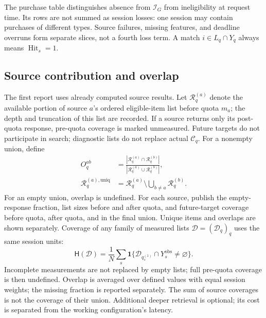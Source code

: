 \documentclass[12pt,a4paper]{article}
\newcommand{\ind}{\mathbf 1}
\theoremstyle{plainru}
\begin{document}
The purchase table distinguishes absence from $\mathcal I_G$
from ineligibility at request time. Its rows are not summed as session
losses: one session may contain purchases of different types.
Source failures, missing features, and deadline overruns
form separate slices, not a fourth loss term.
A match $i\in L_q\cap Y_q$ always means $\operatorname{Hit}_s=1$.

\subsection{Source contribution and overlap}
\label{sec:eval-source-contribution}

The first report uses already computed source results.
Let $\mathcal R_q^{(a)}$ denote the available portion of source $a$'s ordered
eligible-item list before quota $m_a$;
the depth and truncation of this list are recorded. If a source returns
only its post-quota response, pre-quota coverage is marked unmeasured.
Future targets do not participate in search; diagnostic lists
do not replace actual $\mathcal C_q$.
For a nonempty union, define
\begin{align}\label{eq:eval-source-overlap}
O_q^{ab}&=\frac{|\mathcal R_q^{(a)}\cap\mathcal R_q^{(b)}|}
 {|\mathcal R_q^{(a)}\cup\mathcal R_q^{(b)}|},\\
\mathcal R_q^{(a),\mathrm{uniq}}
&=\mathcal R_q^{(a)}\setminus\bigcup_{b\ne a}\mathcal R_q^{(b)}.
\nonumber
\end{align}
For an empty union, overlap is undefined. For each
source, publish the empty-response fraction, list sizes before
and after quota, and future-target coverage before quota, after quota, and in the final
union. Unique items and overlaps are shown separately.
Coverage of any family of measured lists $\mathcal D=(\mathcal D_q)_q$
uses the same session units:
\begin{equation}\label{eq:eval-source-coverage}
\mathsf H(\mathcal D)
=\frac1N\sum_s\ind\{\mathcal D_{q_s^{(1)}}\cap Y_s^{\mathrm{obs}}\ne\varnothing\}.
\end{equation}
Incomplete measurements are not replaced by empty lists; full pre-quota
coverage is then undefined. Overlap is averaged
over defined values with equal session weights;
the missing fraction is reported separately.
The sum of source coverages is not the coverage of their union.
Additional deeper retrieval is optional; its cost
is separated from the working configuration's latency.
\end{document}
